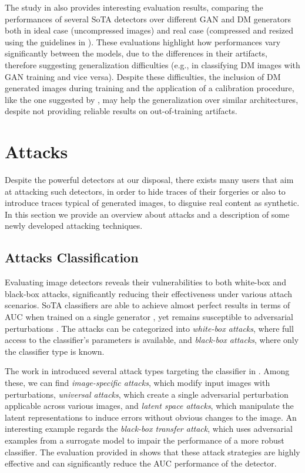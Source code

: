 \documentclass[conference]{IEEEtran} %
\begin{document}
        The study in \cite{corvi2023detection} also provides interesting evaluation results, comparing the performances of several SoTA detectors over different GAN and DM generators both in ideal case (uncompressed images) and real case (compressed and resized using the guidelines in \cite{vipcuplink}). These evaluations highlight how performances vary significantly between the models, due to the differences in their artifacts, therefore suggesting generalization difficulties (e.g., in classifying DM images with GAN training and vice versa). Despite these difficulties, the inclusion of DM generated images during training and the application of a calibration procedure, like the one suggested by \cite{Platt1999probabilistic}, may help the generalization over similar architectures, despite not providing reliable results on out-of-training artifacts.

\section{Attacks}
    Despite the powerful detectors at our disposal, there exists many users that aim at attacking such detectors, in order to hide traces of their forgeries or also to introduce traces typical of generated images, to disguise real content as synthetic. In this section we provide an overview about attacks and a description of some newly developed attacking techniques.

    \subsection{Attacks Classification}
        Evaluating image detectors reveals their vulnerabilities to both white-box and black-box attacks, significantly reducing their effectiveness under various attach scenarios. SoTA classifiers are able to achieve almost perfect results in terms of AUC when trained on a single generator \cite{Wang_2020_CVPR}, yet remains susceptible to adversarial perturbations \cite{de2024exploring}. The attacks can be categorized into \textit{white-box attacks}, where full access to the classifier's parameters is available, and \textit{black-box attacks}, where only the classifier type is known.

        The work in \cite{de2024exploring} introduced several attack types targeting the classifier in \cite{Wang_2020_CVPR}. Among these, we can find \textit{image-specific attacks}, which modify input images with perturbations, \textit{universal attacks}, which create a single adversarial perturbation applicable across various images, and \textit{latent space attacks}, which manipulate the latent representations to induce errors without obvious changes to the image. An interesting example regards the \textit{black-box transfer attack}, which uses adversarial examples from a surrogate model to impair the performance of a more robust classifier. The evaluation provided in \cite{de2024exploring} shows that these attack strategies are highly effective and can significantly reduce the AUC performance of the detector.
        
\end{document}
